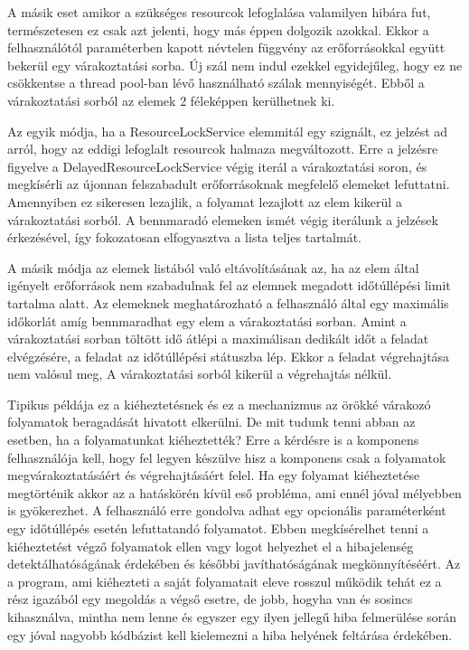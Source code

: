 A másik eset amikor a szükséges resourcok lefoglalása valamilyen hibára fut, természetesen ez csak azt jelenti, hogy más éppen dolgozik azokkal. Ekkor a felhasználótól paraméterben kapott névtelen függvény az erőforrásokkal együtt bekerül egy várakoztatási sorba. Új szál nem indul ezekkel egyidejűleg, hogy ez ne csökkentse a thread pool-ban lévő használható szálak mennyiségét. Ebből a várakoztatási sorból az elemek 2 féleképpen kerülhetnek ki.

Az egyik módja, ha a ResourceLockService elemmitál egy szignált, ez jelzést ad arról, hogy az eddigi lefoglalt resourcok halmaza megváltozott. Erre a jelzésre figyelve a DelayedResourceLockService végig iterál a várakoztatási soron, és megkísérli az újonnan felszabadult erőforrásoknak megfelelő elemeket lefuttatni. Amennyiben ez sikeresen lezajlik, a folyamat lezajlott az elem kikerül a várakoztatási sorból. A bennmaradó elemeken ismét végig iterálunk a jelzések érkezésével, így fokozatosan elfogyasztva a lista teljes tartalmát.

A másik módja az elemek listából való eltávolításának az, ha az elem által igényelt erőforrások nem szabadulnak fel az elemnek megadott időtúllépési limit tartalma alatt. Az elemeknek meghatározható a felhasználó által egy maximális időkorlát amíg bennmaradhat egy elem a várakoztatási sorban. Amint a várakoztatási sorban töltött idő átlépi a maximálisan dedikált időt a feladat elvégzésére, a feladat az időtúllépési státuszba lép. Ekkor a feladat végrehajtása nem valósul meg, A várakoztatási sorból kikerül a végrehajtás nélkül.

Tipikus példája ez a kiéheztetésnek és ez a mechanizmus az örökké várakozó folyamatok beragadását hivatott elkerülni. De mit tudunk tenni abban az esetben, ha a folyamatunkat kiéheztették? Erre a kérdésre is a komponens felhasználója kell, hogy fel legyen készülve hisz a komponens csak a folyamatok megvárakoztatásáért és végrehajtásáért felel. Ha egy folyamat kiéheztetése megtörténik akkor az a hatáskörén kívül eső probléma, ami ennél jóval mélyebben is gyökerezhet. A felhasználó erre gondolva adhat egy opcionális paraméterként egy időtúllépés esetén lefuttatandó folyamatot. Ebben megkísérelhet tenni a kiéheztetést végző folyamatok ellen vagy logot helyezhet el a hibajelenség detektálhatóságának érdekében és későbbi javíthatóságának megkönnyítéséért. Az a program, ami kiéhezteti a saját folyamatait eleve rosszul működik tehát ez a rész igazából egy megoldás a végső esetre, de jobb, hogyha van és sosincs kihasználva, mintha nem lenne és egyszer egy ilyen jellegű hiba felmerülése során egy jóval nagyobb kódbázist kell kielemezni a hiba helyének feltárása érdekében.

